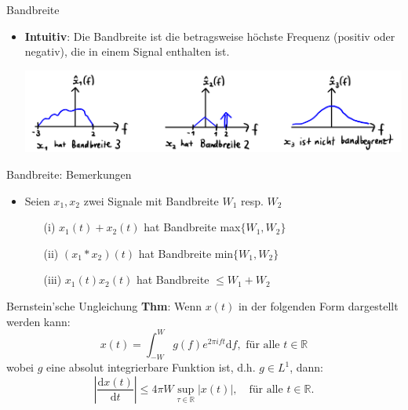 \documentclass[14pt, aspectratio=169, handout]{beamer}
\begin{document}
\begin{frame}{Bandbreite}
    \begin{itemize}
        \item \textbf{Intuitiv}: Die Bandbreite ist die betragsweise höchste Frequenz (positiv oder negativ), die in einem Signal enthalten ist.
        \item[] 
        \item[] \begin{center}
            \includegraphics[width=\linewidth]{figures/Bandbreite.jpg}
        \end{center}
    \end{itemize}
\end{frame}

\begin{frame}{Bandbreite: Bemerkungen}
    \begin{itemize}
        \item Seien $x_1, x_2$ zwei Signale mit Bandbreite $W_1$ resp. $W_2$ \begin{itemize}
        \item[] 
        \item[(i)] $x_1(t) + x_2(t)$ hat Bandbreite max$\{W_1, W_2\}$
        \item[] 
        \item[(ii)] $(x_1 \ast x_2)(t)$ hat Bandbreite min$\{W_1, W_2\}$
        \item[] 
        \item[(iii)] $x_1(t)x_2(t)$ hat Bandbreite $\leq W_1 + W_2$
    \end{itemize}
    \end{itemize}
\end{frame}

\begin{frame}{Bernstein'sche Ungleichung}
    \textbf{Thm}: Wenn $x(t)$ in der folgenden Form dargestellt werden kann: $$x(t) = \displaystyle\int_{-W}^W g(f)e^{2 \pi i f t} \text{d}f, \text{ für alle } t\in \mathbb{R}$$ wobei $g$ eine absolut integrierbare Funktion ist, d.h. $g\in L^1$, dann:  $$\left| \frac{\text{d}x(t)}{\text{d}t} \right| \leq 4 \pi W \sup_{\tau \in \mathbb{R}}|x(t)|, \hspace{12pt} \text{für alle } t \in \mathbb{R}.$$
\end{frame}
\end{document}
